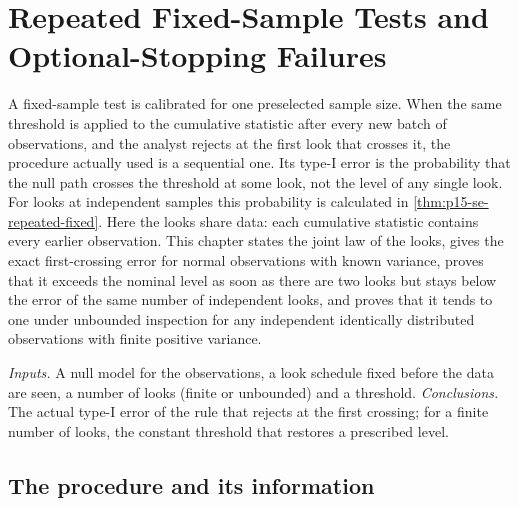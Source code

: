 \chapter{Repeated Fixed-Sample Tests and Optional-Stopping Failures}
\label{sec:p15-w02b-p15-061-cumulative-looks}

A fixed-sample test is calibrated for one preselected sample size. When the
same threshold is applied to the cumulative statistic after every new batch
of observations, and the analyst rejects at the first look that crosses it,
the procedure actually used is a sequential one. Its type-I error is the
probability that the null path crosses the threshold at some look, not the
level of any single look. For looks at independent samples this probability
is calculated in \cref{thm:p15-se-repeated-fixed}. Here the looks share
data: each cumulative statistic contains every earlier observation. This
chapter states the joint law of the looks, gives the exact first-crossing
error for normal observations with known variance, proves that it exceeds
the nominal level as soon as there are two looks but stays below the error
of the same number of independent looks, and proves that it tends to one
under unbounded inspection for any independent identically distributed
observations with finite positive variance.

\emph{Inputs.} A null model for the observations, a look schedule fixed
before the data are seen, a number of looks (finite or unbounded) and a
threshold. \emph{Conclusions.} The actual type-I error of the rule that
rejects at the first crossing; for a finite number of looks, the constant
threshold that restores a prescribed level.

\section{The procedure and its information}
\label{sec:p15-w02b-p15-061-setting}

